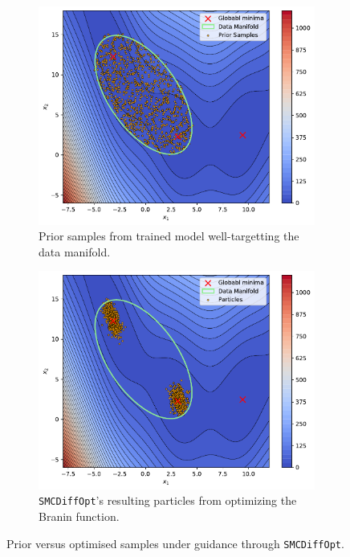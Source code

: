 \begin{figure}[t]
    \centering
    \begin{subfigure}[b]{0.48\textwidth}
        \centering
        \includegraphics[width=1\textwidth]{assets/smc_branin_prior.pdf}
        \caption{Prior samples from trained model well-targetting the data manifold.}
        \label{fig:branin-prior}
    \end{subfigure}
    \hfill
    \begin{subfigure}[b]{0.48\textwidth}
        \centering
        \includegraphics[width=1\textwidth]{assets/smc_branin.pdf}
        \caption{\texttt{SMCDiffOpt}'s resulting particles from optimizing the Branin function.}
        \label{fig:branin-smc}
    \end{subfigure}
    \caption{Prior versus optimised samples under guidance through \texttt{SMCDiffOpt}.}
    \label{fig:branin-prior-smc}
\end{figure}

